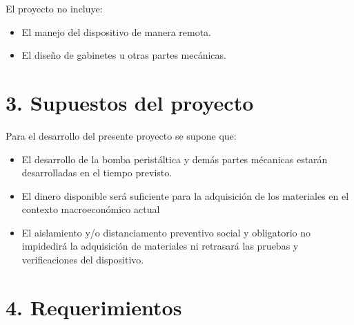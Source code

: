 \documentclass[11pt]{charter}
\begin{document}
\vspace{25px}

El proyecto no incluye:
\begin{itemize}
\item El manejo del dispositivo de manera remota.
\item El diseño de gabinetes u otras partes mecánicas. 
\end{itemize}

\section{3. Supuestos del proyecto}
\label{sec:supuestos}

Para el desarrollo del presente proyecto se supone que:

\begin{itemize}
\item El desarrollo de la bomba peristáltica y demás partes mécanicas estarán desarrolladas en el tiempo previsto.
\item El dinero disponible será suficiente para la adquisición de los materiales en el contexto macroeconómico actual
\item El aislamiento y/o distanciamento preventivo social y obligatorio no impidedirá la adquisición de materiales ni retrasará las pruebas y verificaciones del dispositivo.
\end{itemize}

\section{4. Requerimientos} %
\label{sec:requerimientos}
\end{document}
